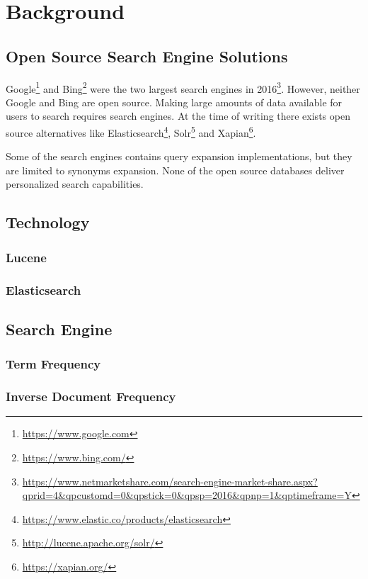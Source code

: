 \chapter{Background}
\label{ch:background}

\section{Open Source Search Engine Solutions}
Google\footnote{\url{https://www.google.com}} and Bing\footnote{\url{https://www.bing.com/}}
were the two largest search engines in 2016\footnote{\url{https://www.netmarketshare.com/search-engine-market-share.aspx?qprid=4&qpcustomd=0&qpstick=0&qpsp=2016&qpnp=1&qptimeframe=Y}}.
However, neither Google and Bing are open source.
Making large amounts of data available for users to search requires search engines.
At the time of writing there exists open source alternatives like Elasticsearch\footnote{\url{https://www.elastic.co/products/elasticsearch}},
Solr\footnote{\url{http://lucene.apache.org/solr/}} and Xapian\footnote{\url{https://xapian.org/}}.

Some of the search engines contains query expansion implementations,
but they are limited to synonyms expansion.
None of the open source databases deliver personalized search capabilities.

\section{Technology}

\subsection{Lucene}

\subsection{Elasticsearch}

\section{Search Engine}

\subsection{Term Frequency}

\subsection{Inverse Document Frequency}


